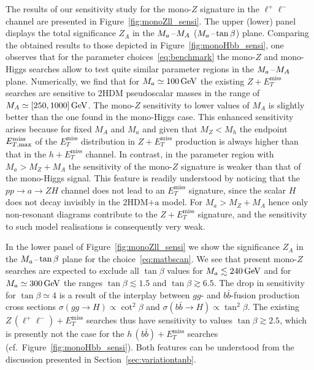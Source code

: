 \documentclass[a4paper, 11pt,notoc]{article}
\newcommand{\MET}{\ensuremath{E_T^\mathrm{miss}}\xspace}
\newcommand{\mA}{\ensuremath{M_{A}}\xspace}
\newcommand{\ma}{\ensuremath{M_{a}}\xspace}
\newcommand{\hdma}{\ensuremath{\textrm{2HDM+a}}\xspace}
\begin{document}
The results of our sensitivity study for the mono-$Z$ signature in the $\ell^+ \ell^-$ channel are presented in Figure~\ref{fig:monoZll_sensi}. The upper (lower) panel displays the total significance $Z_A$  in the $\ma\hspace{0.25mm}$--$\hspace{0.25mm}\mA$ ($\ma\hspace{0.25mm}$--$\hspace{0.25mm}\tan \beta$) plane. Comparing the obtained results to those depicted in Figure~\ref{fig:monoHbb_sensi}, one observes that for the parameter choices~\eqref{eq:benchmark} the mono-$Z$ and mono-Higgs searches allow to test quite similar parameter regions in the $\ma\hspace{0.25mm}$--$\hspace{0.25mm}\mA$ plane. Numerically, we find  that for $\ma \simeq 100 \, {\rm GeV}$  the existing $Z + \MET$ searches are sensitive to 2HDM pseudoscalar masses  in the range of $\mA \simeq [250, 1000] \, {\rm GeV}$. The mono-$Z$ sensitivity to lower values of $M_A$ is slightly better than the one found in the mono-Higgs case. This enhanced sensitivity arises because for fixed $M_A$ and $M_a$ and given that $M_Z < M_h$ the endpoint $E_{T, \rm max}^{\rm miss}$ of the $\MET$ distribution in $Z+ \MET$ production is always higher  than that in  the $h+ \MET$ channel. In contrast, in the parameter region with $M_a > M_Z + M_A$ the sensitivity of the mono-$Z$ signature is weaker than that of the mono-Higgs  signal. This feature is readily understood by noticing that the $pp \to a \to Z H$ channel does not lead to an $\MET$ signature, since the scalar $H$ does not decay invisibly in the \hdma model. For $M_a > M_Z + M_A$ hence only non-resonant diagrams contribute to the $Z+\MET$ signature, and the sensitivity to such model realisations is consequently very weak. 

 In the lower panel of Figure~\ref{fig:monoZll_sensi} we show the significance $Z_A$ in the $\ma\hspace{0.25mm}$--$\hspace{0.25mm}\tan \beta$ plane for the choice~\eqref{eq:matbscan}.  We see that present mono-$Z$ searches are expected to exclude all $\tan \beta$ values for $M_a \lesssim 240 \, {\rm GeV}$ and for $M_a \simeq 300 \, {\rm GeV}$ the ranges $\tan \beta \lesssim 1.5$ and $\tan \beta \gtrsim 6.5$. The drop in sensitivity for $\tan \beta \simeq 4$ is a result of the interplay between $gg$- and $b \bar b$-fusion production cross sections $\sigma ( g g \to H ) \propto \cot^2 \beta$ and $\sigma ( b \bar b  \to H ) \propto \tan^2 \beta$. The existing $Z \, (\ell^+ \ell^-) + \MET$ searches thus have sensitivity to  values $\tan \beta \gtrsim 2.5$, which is presently not the case for the $h \, (b \bar b) + \MET$ searches (cf.~Figure~\ref{fig:monoHbb_sensi}). Both features can be understood from the discussion presented in Section~\ref{sec:variationtanb}.
 
\end{document}
